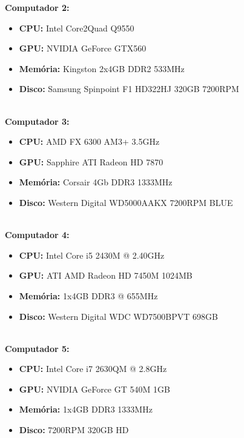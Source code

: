 \documentclass[10pt,a4paper]{report}
\begin{document}
\textbf{Computador 2:}

\begin{itemize}
\item \textbf{CPU:} Intel Core2Quad Q9550
\item \textbf{GPU:} NVIDIA GeForce GTX560
\item \textbf{Memória:} Kingston 2x4GB DDR2 533MHz
\item \textbf{Disco:} Samsung Spinpoint F1 HD322HJ 320GB 7200RPM
\\ \\
\end{itemize}

\textbf{Computador 3:}

\begin{itemize}
\item \textbf{CPU:} AMD FX 6300 AM3+ 3.5GHz
\item \textbf{GPU:} Sapphire ATI Radeon HD 7870
\item \textbf{Memória:} Corsair 4Gb  DDR3 1333MHz
\item \textbf{Disco:} Western Digital WD5000AAKX 7200RPM BLUE
\\ \\
\end{itemize}

\textbf{Computador 4:}

\begin{itemize}
\item \textbf{CPU:} Intel Core i5 2430M @ 2.40GHz
\item \textbf{GPU:} ATI AMD Radeon HD 7450M 1024MB
\item \textbf{Memória:} 1x4GB DDR3 @ 655MHz
\item \textbf{Disco:} Western Digital WDC WD7500BPVT 698GB
\\ \\
\end{itemize}

\textbf{Computador 5:}

\begin{itemize}
\item \textbf{CPU:} Intel Core i7 2630QM @ 2.8GHz
\item \textbf{GPU:} NVIDIA GeForce GT 540M 1GB
\item \textbf{Memória:} 1x4GB DDR3 1333MHz
\item \textbf{Disco:} 7200RPM 320GB HD
\\ \\
\end{itemize}
\end{document}
